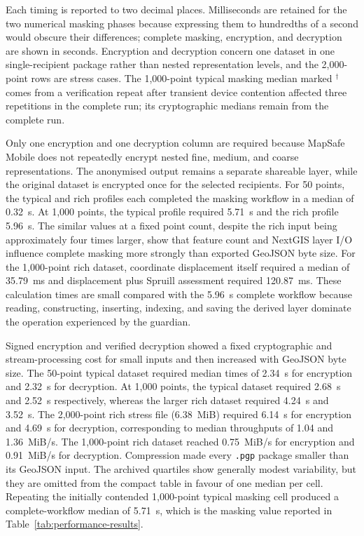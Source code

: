 \documentclass[a4paper,UKenglish,cleveref,autoref,thm-restate]{lipics-v2021}
\begin{document}
\noindent Each timing is reported to two decimal places. Milliseconds are retained for the two numerical masking phases because expressing them to hundredths of a second would obscure their differences; complete masking, encryption, and decryption are shown in seconds. Encryption and decryption concern one dataset in one single-recipient package rather than nested representation levels, and the 2,000-point rows are stress cases. The 1,000-point typical masking median marked $^{\dagger}$ comes from a verification repeat after transient device contention affected three repetitions in the complete run; its cryptographic medians remain from the complete run.

Only one encryption and one decryption column are required because MapSafe Mobile does not repeatedly encrypt nested fine, medium, and coarse representations. The anonymised output remains a separate shareable layer, while the original dataset is encrypted once for the selected recipients. For 50 points, the typical and rich profiles each completed the masking workflow in a median of 0.32~s. At 1,000 points, the typical profile required 5.71~s and the rich profile 5.96~s. The similar values at a fixed point count, despite the rich input being approximately four times larger, show that feature count and NextGIS layer I/O influence complete masking more strongly than exported GeoJSON byte size. For the 1,000-point rich dataset, coordinate displacement itself required a median of 35.79~ms and displacement plus Spruill assessment required 120.87~ms. These calculation times are small compared with the 5.96~s complete workflow because reading, constructing, inserting, indexing, and saving the derived layer dominate the operation experienced by the guardian.

Signed encryption and verified decryption showed a fixed cryptographic and stream-processing cost for small inputs and then increased with GeoJSON byte size. The 50-point typical dataset required median times of 2.34~s for encryption and 2.32~s for decryption. At 1,000 points, the typical dataset required 2.68~s and 2.52~s respectively, whereas the larger rich dataset required 4.24~s and 3.52~s. The 2,000-point rich stress file (6.38~MiB) required 6.14~s for encryption and 4.69~s for decryption, corresponding to median throughputs of 1.04 and 1.36~MiB/s. The 1,000-point rich dataset reached 0.75~MiB/s for encryption and 0.91~MiB/s for decryption. Compression made every \texttt{.pgp} package smaller than its GeoJSON input. The archived quartiles show generally modest variability, but they are omitted from the compact table in favour of one median per cell. Repeating the initially contended 1,000-point typical masking cell produced a complete-workflow median of 5.71~s, which is the masking value reported in Table~\ref{tab:performance-results}.
\end{document}
